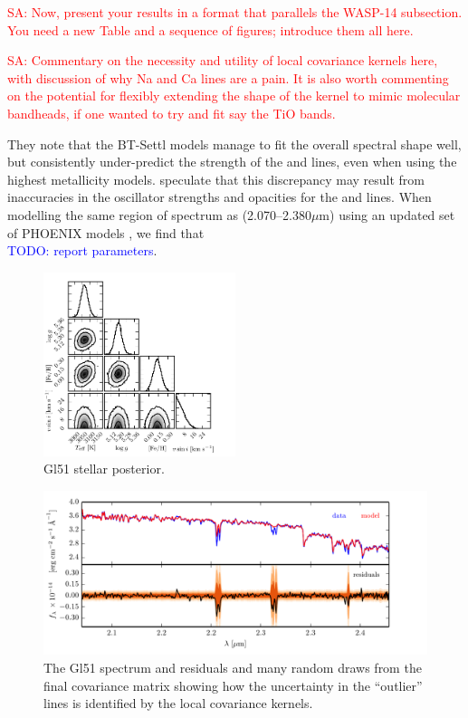 \documentclass[iop,floatfix]{emulateapj}
\newcommand{\todo}[1]{ \textcolor{blue}{\\TODO: #1}}
\newcommand{\comm}[1]{ \textcolor{red}{SA: #1}}
\begin{document}
\comm{Now, present your results in a format that parallels the WASP-14 subsection.  You need a new 
Table and a sequence of figures; introduce them all here.}

\comm{Commentary on the necessity and utility of local covariance kernels here, with discussion of why Na and Ca lines are a pain.  It is also worth commenting on the potential for flexibly extending the shape of 
the kernel to mimic molecular bandheads, if one wanted to try and fit say the TiO bands.}

They note that the BT-Settl models manage to fit the overall spectral shape well, but consistently under-predict the strength of the  and  lines, even when using the highest metallicity models. \citet{rajpurohit10} speculate that this discrepancy may result from inaccuracies in the oscillator strengths and opacities for the  and  lines. When modelling the same region of spectrum as \citet{rojas-ayala12} (2.070--2.380$\mu$m) using an updated set of PHOENIX models \citep{husser13}, we find that \todo{report parameters}.

\begin{figure}[!htb]
\begin{center}
  \includegraphics[width=0.5\textwidth]{figs/Gl51_triangle.pdf}
  \caption{Gl51 stellar posterior.}
\label{fig:gl_posterior}
\end{center}
\end{figure}



\begin{figure}[!htb]
\begin{center}
  \includegraphics{figs/residuals_Gl51_logg.pdf}
  \caption{The Gl51 spectrum and residuals and many random draws from the final covariance matrix showing how the uncertainty in the ``outlier'' lines is identified by the local covariance kernels.}
\label{fig:regions}
\end{center}
\end{figure}
\end{document}
